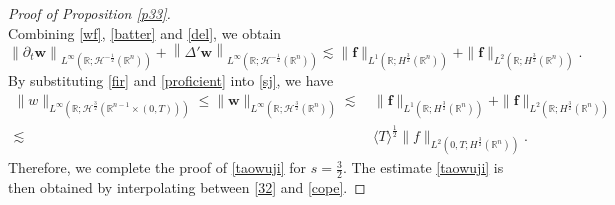 \documentclass[preprint,compress,12pt]{elsarticle}
\numberwithin{equation}{section}
\begin{document}
\begin{proof}[Proof of Proposition \ref{p33}]
\begin{equation}
	\end{equation}
	Combining \eqref{wf}, \eqref{batter} and \eqref{del}, we obtain
	\begin{equation}\label{proficient} \left\|\partial_{t}\boldsymbol{w}\right\|_{L^{\infty}(\mathbb{R};\mathcal{H}^{-\frac{1}{2}}(\mathbb{R}^{n}))}+\left\|\Delta'\boldsymbol{w}\right\|_{L^{\infty}(\mathbb{R};\mathcal{H}^{-\frac{1}{2}}(\mathbb{R}^{n}))}\lesssim  \|\boldsymbol{f}\|_{L^{1}(\mathbb{R};H^{\frac{3}{2}}(\mathbb{R}^{n}))}+\|\boldsymbol{f}\|_{L^{2}(\mathbb{R};H^{\frac{3}{2}}(\mathbb{R}^{n}))}.
	\end{equation}
	By substituting \eqref{fir} and \eqref{proficient} into \eqref{sj}, we have
	\begin{equation}\label{32}
		\begin{aligned}
			\|w\|_{L^{\infty}(\mathbb{R};\mathcal{H}^{\frac{3}{2}}(\mathbb{R}^{n-1}\times(0,T)))}\leq \|\boldsymbol{w}\|_{L^{\infty}(\mathbb{R};\mathcal{H}^{\frac{3}{2}}(\mathbb{R}^{n}))}\lesssim&\,\|\boldsymbol{f}\|_{L^{1}(\mathbb{R};H^{\frac{3}{2}}(\mathbb{R}^{n}))}+\|\boldsymbol{f}\|_{L^{2}(\mathbb{R};H^{\frac{3}{2}}(\mathbb{R}^{n}))}\\
			\lesssim&\,\langle T\rangle^{\frac{1}{2}} \|f\|_{L^{2}(0,T;H^{\frac{3}{2}}(\mathbb{R}^{n}))}.
		\end{aligned}
	\end{equation}
	Therefore, we complete the proof of \eqref{taowuji} for $s=\frac{3}{2}$. The estimate \eqref{taowuji} is then  obtained by  interpolating between \eqref{32} and \eqref{cope}.
\end{proof}
\end{document}
